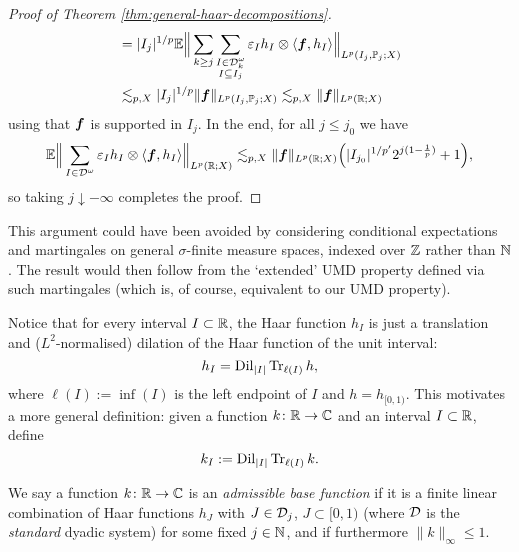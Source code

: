 \begin{proof}[Proof of Theorem \ref{thm:general-haar-decompositions}]
\begin{equation*}
\begin{aligned}
      &=  |I_{j}|^{1/p} \mathbb{E} \Big\| \sum_{k \geq j} \sum_{\substack{I \in \mathcal{D}_{k}^{\omega} \\ I \subseteq I_{j}}} \varepsilon_{I} h_{I} \otimes \langle \bm{f}, h_{I} \rangle \Big\|_{L^p(I_{j}, \mathbb{P}_{j};X)} \\
      &\lesssim_{p,X} |I_{j}|^{1/p} \|\bm{f}\|_{L^p(I_{j},\mathbb{P}_{j};X)} 
      \lesssim_{p,X} \|\bm{f}\|_{L^p(\mathbb{R};X)}
    \end{aligned}
  \end{equation*}
  using that $\bm{f}$ is supported in $I_{j}$.
  In the end, for all $j \leq j_{0}$ we have
  \begin{equation*}
    \mathbb{E} \Big\| \sum_{I \in \mathcal{D}^{\omega}} \varepsilon_{I} h_{I} \otimes \langle \bm{f}, h_{I} \rangle \Big\|_{L^p(\mathbb{R};X)}
    \lesssim_{p,X}  \|\bm{f}\|_{L^p(\mathbb{R};X)} \Big(|I_{j_{0}}|^{1/p'}  2^{j(1 - \frac{1}{p})} + 1\Big),
  \end{equation*}
  so taking $j \downarrow -\infty$ completes the proof.
\end{proof}

\begin{rmk}
  This argument could have been avoided by considering conditional expectations and martingales on general $\sigma$-finite measure spaces, indexed over $\mathbb{Z}$ rather than $\mathbb{N}$.
  The result would then follow from the `extended' UMD property defined via such martingales (which is, of course, equivalent to our UMD property).
\end{rmk}


Notice that for every interval $I \subset \mathbb{R}$, the Haar function $h_{I}$ is just a translation and ($L^2$-normalised) dilation of the Haar function of the unit interval:
\begin{equation*}
  h_{I} = \operatorname{Dil}_{|I|} \operatorname{Tr}_{\ell(I)} h,
\end{equation*}
where $\ell(I) := \inf(I)$ is the left endpoint of $I$ and $h = h_{[0,1)}$.
This motivates a more general definition: given a function $k \colon \mathbb{R} \rightarrow \mathbb{C}$ and an interval $I \subset \mathbb{R}$, define
\begin{equation*}
  k_{I} := \operatorname{Dil}_{|I|} \operatorname{Tr}_{\ell(I)} k.
\end{equation*}

\begin{defn}
  We say a function $k \colon \mathbb{R} \rightarrow \mathbb{C}$ is an \emph{admissible base function} if it is a finite linear combination of Haar functions $h_{J}$ with $J \in \mathcal{D}_{j}$, $J \subset [0,1)$ (where $\mathcal{D}$ is the \emph{standard} dyadic system) for some fixed $j \in \mathbb{N}$, and if furthermore $\|k\|_{\infty} \leq 1$.
\end{defn}

